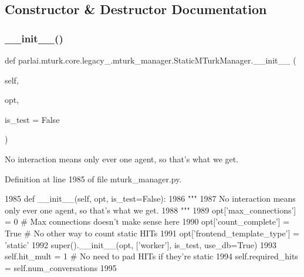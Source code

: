 \subsection{Constructor \& Destructor Documentation}
\mbox{\label{classparlai_1_1mturk_1_1core_1_1legacy__2018_1_1mturk__manager_1_1StaticMTurkManager_a4a658ba3ab68e770cb5dcccdd272aa3b}} 
\subsubsection{\texorpdfstring{\+\_\+\+\_\+init\+\_\+\+\_\+()}{\_\_init\_\_()}}
{\footnotesize\ttfamily def parlai.\+mturk.\+core.\+legacy\+\_.\+mturk\+\_\+manager.\+Static\+M\+Turk\+Manager.\+\_\+\+\_\+init\+\_\+\+\_\+ (\begin{DoxyParamCaption}\item[{}]{self,  }\item[{}]{opt,  }\item[{}]{is\+\_\+test = {\ttfamily False} }\end{DoxyParamCaption})}

\begin{DoxyVerb}No interaction means only ever one agent, so that's what we get.
\end{DoxyVerb}
 

Definition at line 1985 of file mturk\+\_\+manager.\+py.


\begin{DoxyCode}
1985     \textcolor{keyword}{def }\_\_init\_\_(self, opt, is\_test=False):
1986         \textcolor{stringliteral}{"""}
1987 \textcolor{stringliteral}{        No interaction means only ever one agent, so that's what we get.}
1988 \textcolor{stringliteral}{        """}
1989         opt[\textcolor{stringliteral}{'max\_connections'}] = 0  \textcolor{comment}{# Max connections doesn't make sense here}
1990         opt[\textcolor{stringliteral}{'count\_complete'}] = \textcolor{keyword}{True}  \textcolor{comment}{# No other way to count static HITs}
1991         opt[\textcolor{stringliteral}{'frontend\_template\_type'}] = \textcolor{stringliteral}{'static'}
1992         super().\_\_init\_\_(opt, [\textcolor{stringliteral}{'worker'}], is\_test, use\_db=\textcolor{keyword}{True})
1993         self.hit\_mult = 1  \textcolor{comment}{# No need to pad HITs if they're static}
1994         self.required\_hits = self.num\_conversations
1995 
\end{DoxyCode}


